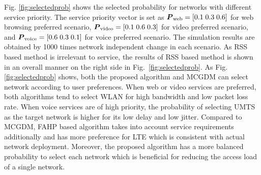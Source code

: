 \documentclass[conference]{IEEEtran}
\begin{document}
Fig. \ref{fig:selectedprob} shows the selected probability for networks with different service priority. The service priority vector is set as $\boldsymbol{P}_{\rm web}=[0.1\; 0.3 \; 0.6]$ for web browsing preferred scenario, $\boldsymbol{P}_{\rm video}=[0.1 \; 0.6\; 0.3]$ for video preferred scenario, and $\boldsymbol{P}_{\rm voice}=[0.6 \; 0.3\; 0.1]$ for voice preferred scenario. 
The simulation results are obtained by 1000 times network independent change in each scenario.
As RSS based method is irrelevant to service,
the results of RSS based method is shown in an overall manner on the right side in Fig.~\ref{fig:selectedprob}. As Fig. \ref{fig:selectedprob} shows, both the proposed algorithm and MCGDM can select network according to user preferences. When web or video services are preferred, both algorithms tend to select WLAN for high bandwidth and low packet loss rate. When voice services are of high priority,  
the probability of selecting UMTS as the target network is higher for its low delay and low jitter.
 Compared to MCGDM, FAHP based algorithm takes into account service requirements additionally and has more preference for LTE which is consistent with actual network deployment. 
Moreover, the proposed algorithm has a more balanced probability to select each network
 which is beneficial for reducing the access load of a single network.

\begin{comment}
	\color{blue}
	UMTS is preferred for low delay and little jitter. Compared to MCGDM, our FAHP based algorithm has more preference on LTE than MCGDM, and has more balanced probability to select every network which is benefitial for reducing access load of single network.content...
\end{comment}
\end{document}
